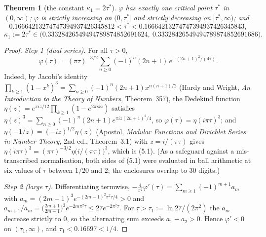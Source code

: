 \documentclass[11pt,a4paper]{article}
\newtheorem{theorem}{Theorem}
\theoremstyle{definition}
\theoremstyle{remark}
\begin{document}
\begin{theorem}[the constant $\kappa_1=2\tau^*$]\label{thm:tau}
$\varphi$ has exactly one critical point $\tau^*$ in $(0,\infty)$; $\varphi$ is strictly increasing on $(0,\tau^*]$ and strictly decreasing on $[\tau^*,\infty)$; and
\[
0.16664213274747394937426345812<\tau^*<0.16664213274747394937426345843,
\]
\[
\kappa_1:=2\tau^*\in\bigl(0.33328426549494789874852691624,\ 0.33328426549494789874852691686\bigr).
\]
\end{theorem}
\begin{proof}
\emph{Step 1 (dual series).} For all $\tau>0$,
\[
\varphi(\tau)=(\pi\tau)^{-3/2}\sum_{n\ge0}(-1)^n(2n+1)\,e^{-(2n+1)^2/(4\tau)}. \tag{5.1}
\]
Indeed, by Jacobi's identity $\prod_{k\ge1}(1-x^k)^3=\sum_{n\ge0}(-1)^n(2n+1)x^{n(n+1)/2}$ (Hardy and Wright, \emph{An Introduction to the Theory of Numbers}, Theorem~357), the Dedekind function $\eta(z)=e^{\pi iz/12}\prod_{k\ge1}(1-e^{2\pi ikz})$ satisfies $\eta(z)^3=\sum_{n\ge0}(-1)^n(2n+1)e^{\pi iz(2n+1)^2/4}$, so $\varphi(\tau)=\eta(i\pi\tau)^3$; and $\eta(-1/z)=(-iz)^{1/2}\eta(z)$ (Apostol, \emph{Modular Functions and Dirichlet Series in Number Theory}, 2nd ed., Theorem~3.1) with $z=i/(\pi\tau)$ gives $\eta(i\pi\tau)^3=(\pi\tau)^{-3/2}\eta\bigl(i/(\pi\tau)\bigr)^3$, which is (5.1). (As a safeguard against a mis-transcribed normalisation, both sides of (5.1) were evaluated in ball arithmetic at six values of $\tau$ between $1/20$ and $2$; the enclosures overlap to $30$ digits.)

\emph{Step 2 (large $\tau$).} Differentiating termwise, $-\frac4{\pi^2}\varphi'(\tau)=\sum_{m\ge1}(-1)^{m+1}a_m$ with $a_m=(2m-1)^3e^{-(2m-1)^2\pi^2\tau/4}>0$ and
$a_{m+1}/a_m=\bigl(\tfrac{2m+1}{2m-1}\bigr)^3e^{-2m\pi^2\tau}\le27e^{-2\pi^2\tau}$. For $\tau>\tau_1:=\ln27/(2\pi^2)$ the $a_m$ decrease strictly to $0$, so the alternating sum exceeds $a_1-a_2>0$. Hence $\varphi'<0$ on $(\tau_1,\infty)$, and $\tau_1<0.16697<1/4$.


\end{proof}
\end{document}
